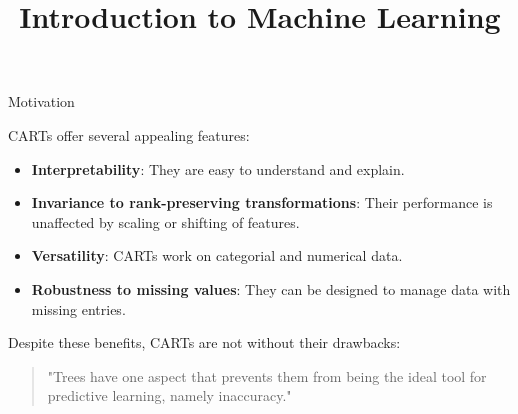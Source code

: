 \documentclass[11pt,compress,t,notes=noshow, xcolor=table]{beamer}
\title{Introduction to Machine Learning}
\institute{\href{https://compstat-lmu.github.io/lecture_i2ml/}{compstat-lmu.github.io/lecture\_i2ml}}
\date{}
\begin{document}
\sloppy

\begin{vbframe}{Motivation}

CARTs offer several appealing features:

\begin{itemize}
  \item \textbf{Interpretability}: They are easy to understand and explain.
  \item \textbf{Invariance to rank-preserving transformations}: Their performance is unaffected by scaling or shifting of features.
  \item \textbf{Versatility}: CARTs work on categorial and numerical data.
  \item \textbf{Robustness to missing values}: They can be designed to manage data with missing entries.
\end{itemize}

\vspace{1em}
Despite these benefits, CARTs are not without their drawbacks:
\vspace{1em}

\begin{quotation}
"Trees have one aspect that prevents them from being the ideal tool for predictive learning, namely inaccuracy."
\end{quotation}

\end{vbframe}
\end{document}
